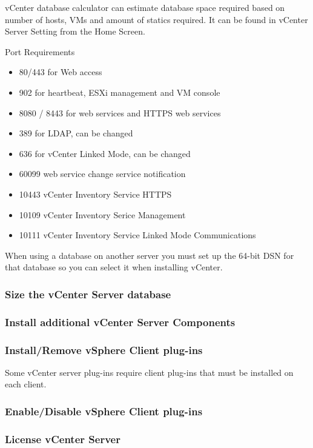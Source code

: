 vCenter database calculator can estimate database space required based on number of hosts,
VMs and amount of statics required. It can be found in vCenter Server Setting from the
Home Screen.

Port Requirements

\begin{itemize}
\item 80/443 for Web access
\item 902 for heartbeat, ESXi management and VM console
\item 8080 / 8443 for web services and HTTPS web services
\item 389 for LDAP, can be changed
\item 636 for vCenter Linked Mode, can be changed
\item 60099 web service change service notification
\item 10443 vCenter Inventory Service HTTPS
\item 10109 vCenter Inventory Serice Management
\item 10111 vCenter Inventory Service Linked Mode Communications
\end{itemize}

When using a database on another server you must set up the 64-bit DSN for that database so you
can select it when installing vCenter.

\subsubsection{Size the vCenter Server database}

\subsubsection{Install additional vCenter Server Components}

\subsubsection{Install/Remove vSphere Client plug-ins}

Some vCenter server plug-ins require client plug-ins that must be installed
on each client.

\subsubsection{Enable/Disable vSphere Client plug-ins}

\subsubsection{License vCenter Server}

